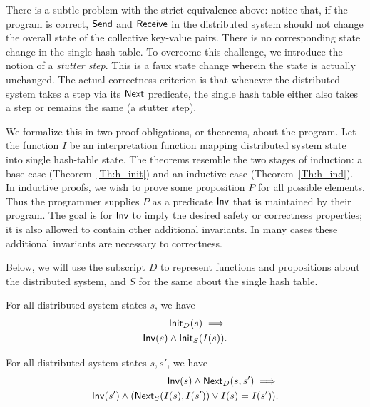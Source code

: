 There is a subtle problem with the strict equivalence above: notice that, if the
program is correct, \(\mathsf{Send}\) and \(\mathsf{Receive}\) in the distributed
system should not change the overall state of the collective key-value pairs.
There is no corresponding state change in the single hash table. To overcome
this challenge, we introduce the notion of a \emph{stutter step}. This is a faux
state change wherein the state is actually unchanged. The actual
correctness criterion is that whenever the distributed system takes a step via
its \(\mathsf{Next}\) predicate, the single hash table either also takes a step or
remains the same (a stutter step).

We formalize this in two proof obligations, or theorems, about the program. Let
the function \(I\) be an interpretation function mapping distributed system
state into single hash-table state. The theorems resemble the two stages of
induction: a base case (Theorem~\ref{Th:h_init}) and an inductive case
(Theorem~\ref{Th:h_ind}). In inductive proofs, we wish to prove some proposition
\(P\) for all possible elements. Thus the programmer supplies \(P\) as a
predicate \(\mathsf{Inv}\) that is maintained by their program. The goal is for
\(\mathsf{Inv}\) to imply the desired safety or correctness properties; it is also
allowed to contain other additional invariants. In many cases these additional
invariants are necessary to correctness.

Below, we will use the subscript \(D\) to represent functions and propositions
about the distributed system, and \(S\) for the same about the single hash
table.

\begin{thm}\label{Th:h_init}
    For all distributed system states \(s\), we have
    \begin{align*}
        \mathsf{Init}_{D}(s) \implies \\
        \mathsf{Inv}(s) \land \mathsf{Init}_{S}(I(s)).
    \end{align*}
\end{thm}

\begin{thm}\label{Th:h_ind}
    For all distributed system states \(s, s'\), we have
    \begin{align*}
        \mathsf{Inv}(s) \land \mathsf{Next}_{D}(s, s') \implies \\
        \mathsf{Inv}(s') \land (\mathsf{Next}_{S}(I(s), I(s')) \lor I(s) = I(s')).
    \end{align*}
\end{thm}

